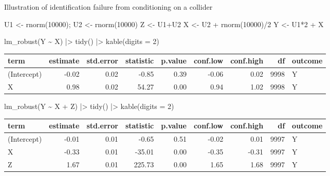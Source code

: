 \documentclass[
  11pt,
  ignorenonframetext,
]{beamer}
\newenvironment{Shaded}{\begin{snugshade}}{\end{snugshade}}
\newcommand{\AttributeTok}[1]{\textcolor[rgb]{0.40,0.45,0.13}{#1}}
\newcommand{\DecValTok}[1]{\textcolor[rgb]{0.68,0.00,0.00}{#1}}
\newcommand{\FunctionTok}[1]{\textcolor[rgb]{0.28,0.35,0.67}{#1}}
\newcommand{\NormalTok}[1]{\textcolor[rgb]{0.00,0.23,0.31}{#1}}
\newcommand{\OtherTok}[1]{\textcolor[rgb]{0.00,0.23,0.31}{#1}}
\newcommand{\SpecialCharTok}[1]{\textcolor[rgb]{0.37,0.37,0.37}{#1}}
\begin{document}
\begin{frame}[fragile]{Illustration of identification failure from
conditioning on a collider}
\protect\hypertarget{illustration-of-identification-failure-from-conditioning-on-a-collider}{}
\begin{Shaded}
\begin{Highlighting}[]
\NormalTok{U1 }\OtherTok{\textless{}{-}} \FunctionTok{rnorm}\NormalTok{(}\DecValTok{10000}\NormalTok{);  U2 }\OtherTok{\textless{}{-}} \FunctionTok{rnorm}\NormalTok{(}\DecValTok{10000}\NormalTok{)}
\NormalTok{Z  }\OtherTok{\textless{}{-}}\NormalTok{ U1}\SpecialCharTok{+}\NormalTok{U2}
\NormalTok{X  }\OtherTok{\textless{}{-}}\NormalTok{ U2 }\SpecialCharTok{+} \FunctionTok{rnorm}\NormalTok{(}\DecValTok{10000}\NormalTok{)}\SpecialCharTok{/}\DecValTok{2}
\NormalTok{Y  }\OtherTok{\textless{}{-}}\NormalTok{ U1}\SpecialCharTok{*}\DecValTok{2} \SpecialCharTok{+}\NormalTok{ X}

\FunctionTok{lm\_robust}\NormalTok{(Y }\SpecialCharTok{\textasciitilde{}}\NormalTok{ X) }\SpecialCharTok{|\textgreater{}} \FunctionTok{tidy}\NormalTok{() }\SpecialCharTok{|\textgreater{}} \FunctionTok{kable}\NormalTok{(}\AttributeTok{digits =} \DecValTok{2}\NormalTok{)}
\end{Highlighting}
\end{Shaded}

\begin{tabular}{l|r|r|r|r|r|r|r|l}
\hline
term & estimate & std.error & statistic & p.value & conf.low & conf.high & df & outcome\\
\hline
(Intercept) & -0.02 & 0.02 & -0.85 & 0.39 & -0.06 & 0.02 & 9998 & Y\\
\hline
X & 0.98 & 0.02 & 54.27 & 0.00 & 0.94 & 1.02 & 9998 & Y\\
\hline
\end{tabular}

\begin{Shaded}
\begin{Highlighting}[]
\FunctionTok{lm\_robust}\NormalTok{(Y }\SpecialCharTok{\textasciitilde{}}\NormalTok{ X }\SpecialCharTok{+}\NormalTok{ Z) }\SpecialCharTok{|\textgreater{}} \FunctionTok{tidy}\NormalTok{() }\SpecialCharTok{|\textgreater{}} \FunctionTok{kable}\NormalTok{(}\AttributeTok{digits =} \DecValTok{2}\NormalTok{)}
\end{Highlighting}
\end{Shaded}

\begin{tabular}{l|r|r|r|r|r|r|r|l}
\hline
term & estimate & std.error & statistic & p.value & conf.low & conf.high & df & outcome\\
\hline
(Intercept) & -0.01 & 0.01 & -0.65 & 0.51 & -0.02 & 0.01 & 9997 & Y\\
\hline
X & -0.33 & 0.01 & -35.01 & 0.00 & -0.35 & -0.31 & 9997 & Y\\
\hline
Z & 1.67 & 0.01 & 225.73 & 0.00 & 1.65 & 1.68 & 9997 & Y\\
\hline
\end{tabular}
\end{frame}
\end{document}
